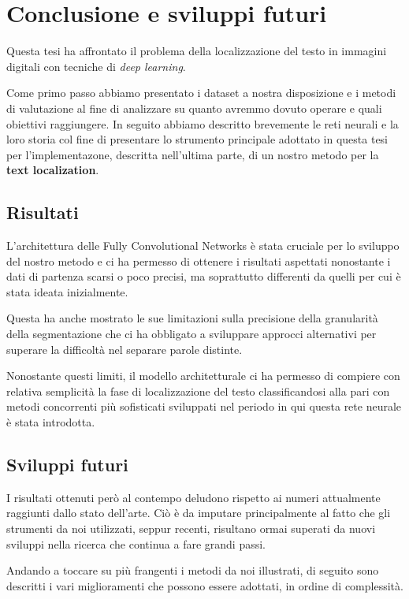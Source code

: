 \chapter{Conclusione e sviluppi futuri}

Questa tesi ha affrontato il problema della localizzazione del testo in immagini digitali con tecniche di \textit{deep learning}.\par
Come primo passo abbiamo presentato i dataset a nostra disposizione e i metodi di valutazione al fine di analizzare su quanto avremmo dovuto operare e quali obiettivi raggiungere. In seguito abbiamo descritto brevemente le reti neurali e la loro storia col fine di presentare lo strumento principale adottato in questa tesi per l'implementazone, descritta nell'ultima parte, di un nostro metodo per la \textbf{text localization}.\par


\section{Risultati}
L'architettura delle Fully Convolutional Networks è stata cruciale per lo sviluppo del nostro metodo e ci ha permesso di ottenere i risultati aspettati nonostante i dati di partenza scarsi o poco precisi, ma soprattutto differenti da quelli per cui è stata ideata inizialmente.\par 
Questa ha anche mostrato le sue limitazioni sulla precisione della granularità della segmentazione che ci ha obbligato a sviluppare approcci alternativi per superare la difficoltà nel separare parole distinte.\par
Nonostante questi limiti, il modello architetturale ci ha permesso di compiere con relativa semplicità la fase di localizzazione del testo classificandosi alla pari con metodi concorrenti più sofisticati sviluppati nel periodo in qui questa rete neurale è stata introdotta.


\section{Sviluppi futuri}
I risultati ottenuti però al contempo deludono rispetto ai numeri attualmente raggiunti dallo stato dell'arte. Ciò è da imputare principalmente al fatto che gli strumenti da noi utilizzati, seppur recenti, risultano ormai superati da nuovi sviluppi nella ricerca che continua a fare grandi passi.\par 
Andando a toccare su più frangenti i metodi da noi illustrati, di seguito sono descritti i vari miglioramenti che possono essere adottati, in ordine di complessità.

